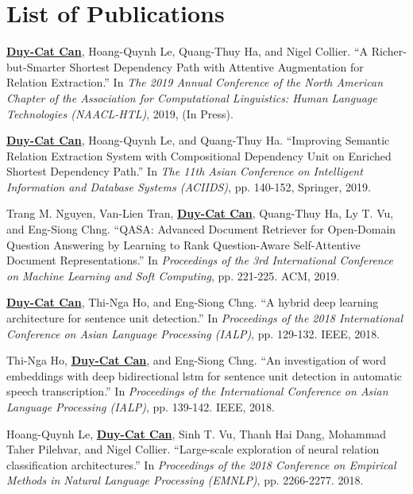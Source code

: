 \chapter*{List of Publications}

\begin{enumerate}[label={[Pub \arabic*]},leftmargin=3cm]

\item \underline{\textbf{Duy-Cat Can}}, Hoang-Quynh Le, Quang-Thuy Ha, and Nigel Collier. ``A Richer-but-Smarter Shortest Dependency Path with Attentive Augmentation for Relation Extraction.'' In \textit{The 2019 Annual Conference of the North American Chapter of the Association for Computational Linguistics: Human Language Technologies (NAACL-HTL)}, 2019, (In Press).

\item \underline{\textbf{Duy-Cat Can}}, Hoang-Quynh Le, and Quang-Thuy Ha. ``Improving Semantic Relation Extraction System with Compositional Dependency Unit on Enriched Shortest Dependency Path.'' In \textit{The 11th Asian Conference on Intelligent Information and Database Systems (ACIIDS)}, pp. 140-152, Springer, 2019.

\item Trang M. Nguyen, Van-Lien Tran, \underline{\textbf{Duy-Cat Can}}, Quang-Thuy Ha, Ly T. Vu, and Eng-Siong Chng. ``QASA: Advanced Document Retriever for Open-Domain Question Answering by Learning to Rank Question-Aware Self-Attentive Document Representations.'' In \textit{Proceedings of the 3rd International Conference on Machine Learning and Soft Computing}, pp. 221-225. ACM, 2019.

\item \underline{\textbf{Duy-Cat Can}}, Thi-Nga Ho, and Eng-Siong Chng. ``A hybrid deep learning architecture for sentence unit detection.'' In \textit{Proceedings of the 2018 International Conference on Asian Language Processing (IALP)}, pp. 129-132. IEEE, 2018.

\item Thi-Nga Ho, \underline{\textbf{Duy-Cat Can}}, and Eng-Siong Chng. ``An investigation of word embeddings with deep bidirectional lstm for sentence unit detection in automatic speech transcription.'' In \textit{Proceedings of the International Conference on Asian Language Processing (IALP)}, pp. 139-142. IEEE, 2018.

\item Hoang-Quynh Le, \underline{\textbf{Duy-Cat Can}}, Sinh T. Vu, Thanh Hai Dang, Mohammad Taher Pilehvar, and Nigel Collier. ``Large-scale exploration of neural relation classification architectures.'' In \textit{Proceedings of the 2018 Conference on Empirical Methods in Natural Language Processing (EMNLP)}, pp. 2266-2277. 2018.

\end{enumerate}